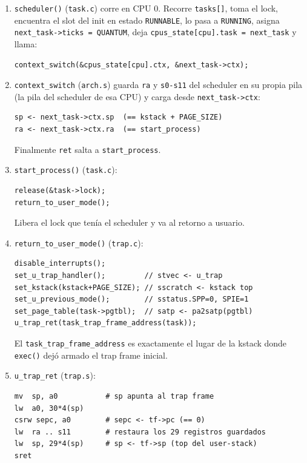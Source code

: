 \documentclass[11pt,a4paper]{article}
\begin{document}
\begin{enumerate}[leftmargin=1.6em]
    \item \texttt{scheduler()} (\texttt{task.c}) corre en CPU 0. Recorre
    \texttt{tasks[]}, toma el lock, encuentra el slot del init en estado
    \texttt{RUNNABLE}, lo pasa a \texttt{RUNNING}, asigna
    \texttt{next\_task->ticks = QUANTUM}, deja
    \texttt{cpus\_state[cpu].task = next\_task} y llama:
    \begin{lstlisting}[style=cstyle]
context_switch(&cpus_state[cpu].ctx, &next_task->ctx);
    \end{lstlisting}
    \item \texttt{context\_switch} (\texttt{arch.s}) guarda \texttt{ra} y
    \texttt{s0-s11} del scheduler en su propia pila (la pila del scheduler de esa
    CPU) y carga desde \texttt{next\_task->ctx}:
    \begin{lstlisting}[style=textstyle]
sp <- next_task->ctx.sp  (== kstack + PAGE_SIZE)
ra <- next_task->ctx.ra  (== start_process)
    \end{lstlisting}
    Finalmente \texttt{ret} salta a \texttt{start\_process}.
    \item \texttt{start\_process()} (\texttt{task.c}):
    \begin{lstlisting}[style=cstyle]
release(&task->lock);
return_to_user_mode();
    \end{lstlisting}
    Libera el lock que tenía el scheduler y va al retorno a usuario.
    \item \texttt{return\_to\_user\_mode()} (\texttt{trap.c}):
    \begin{lstlisting}[style=cstyle]
disable_interrupts();
set_u_trap_handler();         // stvec <- u_trap
set_kstack(kstack+PAGE_SIZE); // sscratch <- kstack top
set_u_previous_mode();        // sstatus.SPP=0, SPIE=1
set_page_table(task->pgtbl);  // satp <- pa2satp(pgtbl)
u_trap_ret(task_trap_frame_address(task));
    \end{lstlisting}
    El \texttt{task\_trap\_frame\_address} es exactamente el lugar de la kstack
    donde \texttt{exec()} dejó armado el trap frame inicial.
    \item \texttt{u\_trap\_ret} (\texttt{trap.s}):
    \begin{lstlisting}[style=textstyle]
mv  sp, a0           # sp apunta al trap frame
lw  a0, 30*4(sp)
csrw sepc, a0        # sepc <- tf->pc (== 0)
lw  ra .. s11        # restaura los 29 registros guardados
lw  sp, 29*4(sp)     # sp <- tf->sp (top del user-stack)
sret
    \end{lstlisting}

\end{enumerate}
\end{document}
